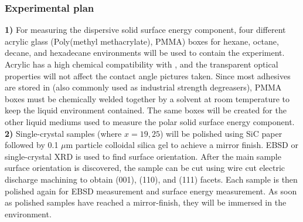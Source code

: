 \subsubsection{Experimental plan}
\textbf{1)} For measuring the dispersive solid surface energy component, four different acrylic glass (Poly(methyl methacrylate), PMMA) boxes for hexane, octane, decane, and hexadecane environments will be used to contain the experiment. Acrylic has a high chemical compatibility with \nalk[s], and the transparent optical properties will not affect the contact angle pictures taken.\cite{Thermoscientific} Since most adhesives are stored in \nalk[s] (also commonly used as industrial strength degreasers), PMMA boxes must be chemically welded together by a solvent at room temperature to keep the liquid environment contained. The same boxes will be created for the other liquid mediums used to measure the polar solid surface energy component. \\
\textbf{2)} Single-crystal samples (\fegacomp where $x=19,25$) will be polished using SiC paper followed by 0.1 $\mu$m particle colloidal silica gel to achieve a mirror finish. EBSD or single-crystal XRD is used to find surface orientation. After the main sample surface orientation is discovered, the sample can be cut using wire cut electric discharge machining to obtain \hkl(001), \hkl(110), and \hkl(111) facets. Each sample is then polished again for EBSD measurement and surface energy measurement. As soon as polished samples have reached a mirror-finish, they will be immersed in the \nalk environment. \\ 
